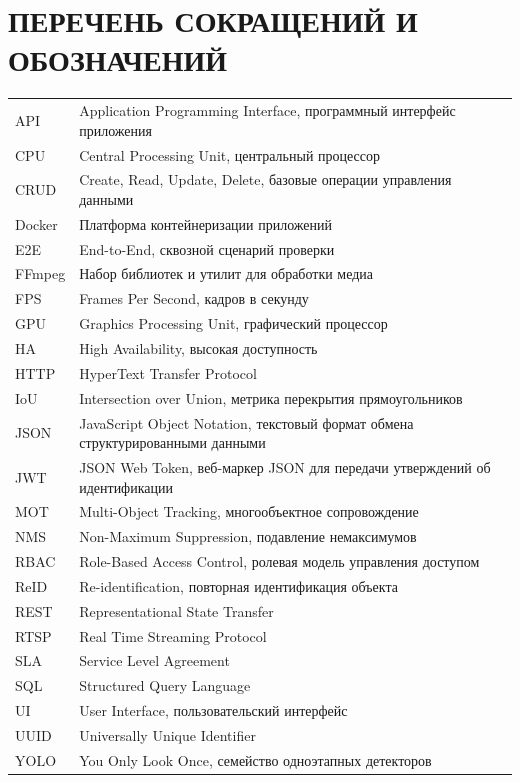 \chapter*{ПЕРЕЧЕНЬ СОКРАЩЕНИЙ И ОБОЗНАЧЕНИЙ}

\begin{longtable}{@{}p{}p{}@{}}
API & Application Programming Interface, программный интерфейс приложения \\
CPU & Central Processing Unit, центральный процессор \\
CRUD & Create, Read, Update, Delete, базовые операции управления данными \\
Docker & Платформа контейнеризации приложений \\
E2E & End-to-End, сквозной сценарий проверки \\
FFmpeg & Набор библиотек и утилит для обработки медиа \\
FPS & Frames Per Second, кадров в секунду \\
GPU & Graphics Processing Unit, графический процессор \\
HA & High Availability, высокая доступность \\
HTTP & HyperText Transfer Protocol \\
IoU & Intersection over Union, метрика перекрытия прямоугольников \\
JSON & JavaScript Object Notation, текстовый формат обмена структурированными данными \\
JWT & JSON Web Token, веб-маркер JSON для передачи утверждений об идентификации \\
MOT & Multi-Object Tracking, многообъектное сопровождение \\
NMS & Non-Maximum Suppression, подавление немаксимумов \\
RBAC & Role-Based Access Control, ролевая модель управления доступом \\
ReID & Re-identification, повторная идентификация объекта \\
REST & Representational State Transfer \\
RTSP & Real Time Streaming Protocol \\
SLA & Service Level Agreement \\
SQL & Structured Query Language \\
UI & User Interface, пользовательский интерфейс \\
UUID & Universally Unique Identifier \\
YOLO & You Only Look Once, семейство одноэтапных детекторов \\
\end{longtable}
